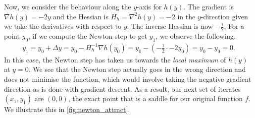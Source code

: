 Now, we consider the behaviour along the $y$-axis for $h(y)$. The gradient is $\nabla h(y) = -2y$ and the Hessian is $H_h = \nabla^2 h(y) = -2$ in the $y$-direction given we take the derivatives with respect to $y$. The inverse Hessian is now $-\frac{1}{2}$. For a point $y_0$, if we compute the Newton step to get $y_1$, we observe the following.
\begin{align}
    y_1 = y_0 + \Delta y = y_0 - H_h^{-1} \nabla h(y_0) = y_0 - \left(-\frac{1}{2} \cdot -2 y_0\right) = y_0 - y_0 = 0.
\end{align}
In this case, the Newton step has taken us towards the \textit{local maximum} of $h(y)$ at $y = 0$. We see that the Newton step actually goes in the wrong direction and does not minimise the function, which would involve taking the negative gradient direction as is done with gradient descent. As a result, our next set of iterates $(x_1, y_1)$ are $(0, 0)$, the exact point that is a saddle for our original function $f$. We illustrate this in \cref{fig:newton_attract}.

